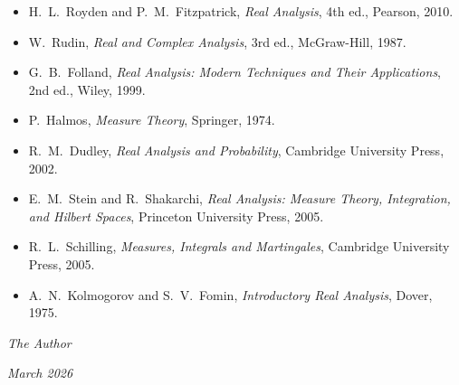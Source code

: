 \begin{itemize}
    \item H.~L.~Royden and P.~M.~Fitzpatrick, \emph{Real Analysis}, 4th ed.,
    Pearson, 2010.
    \item W.~Rudin, \emph{Real and Complex Analysis}, 3rd ed., McGraw-Hill, 1987.
    \item G.~B.~Folland, \emph{Real Analysis: Modern Techniques and Their
    Applications}, 2nd ed., Wiley, 1999.
    \item P.~Halmos, \emph{Measure Theory}, Springer, 1974.
    \item R.~M.~Dudley, \emph{Real Analysis and Probability}, Cambridge University
    Press, 2002.
    \item E.~M.~Stein and R.~Shakarchi, \emph{Real Analysis: Measure Theory,
    Integration, and Hilbert Spaces}, Princeton University Press, 2005.
    \item R.~L.~Schilling, \emph{Measures, Integrals and Martingales}, Cambridge
    University Press, 2005.
    \item A.~N.~Kolmogorov and S.~V.~Fomin, \emph{Introductory Real Analysis},
    Dover, 1975.
\end{itemize}

\bigskip
\hfill \emph{The Author}

\hfill \emph{March 2026}
